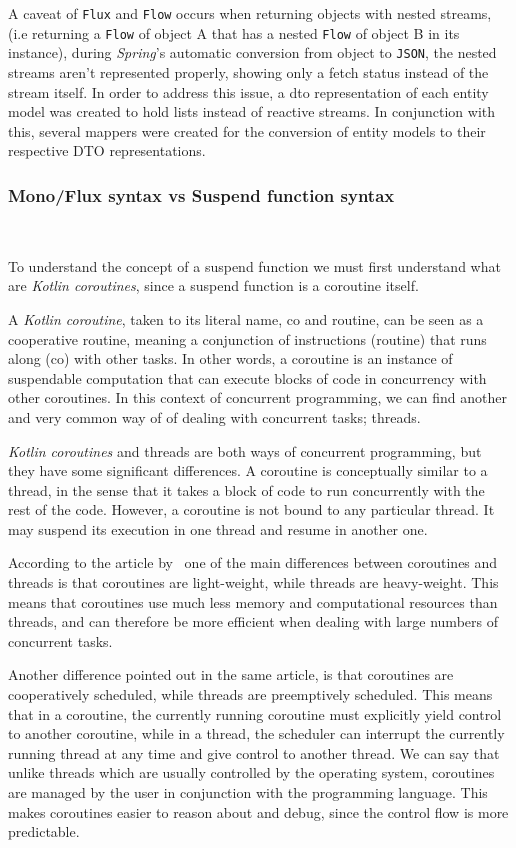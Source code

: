 A caveat of \texttt{Flux} and \texttt{Flow} occurs when returning objects with nested streams, (i.e returning a \texttt{Flow} of object A that has a nested \texttt{Flow} of object B in its instance), during \textit{Spring}'s automatic conversion from object to \texttt{JSON}, the nested streams aren't represented properly, showing only a fetch status instead of the stream itself. In order to address this issue, a \acrfull{dto} representation of each entity model was created to hold lists instead of reactive streams. In conjunction with this, several mappers were created for the conversion of entity models to their respective DTO representations.


\subsubsection{Mono/Flux syntax vs Suspend function syntax}~\label{subsubsec:kotlin-coroutines}

To understand the concept of a suspend function we must first understand what are \textit{Kotlin coroutines}, since a suspend function is a coroutine itself.

A \textit{Kotlin coroutine}, taken to its literal name, co and routine, can be seen as a cooperative routine, meaning a conjunction of instructions (routine) that runs along (co) with other tasks. In other words, a coroutine is an instance of suspendable computation that can execute blocks of code in concurrency with other coroutines.
In this context of concurrent programming, we can find another and very common way of of dealing with concurrent tasks; threads. 

\textit{Kotlin coroutines} and threads are both ways of concurrent programming, but they have some significant differences.
A coroutine is conceptually similar to a thread, in the sense that it takes a block of code to run concurrently with the rest of the code. However, a coroutine is not bound to any particular thread. It may suspend its execution in one thread and resume in another one.~\cite{kotlin-coroutines-your-first}

According to the article by~ one of the main differences between coroutines and threads is that coroutines are light-weight, while threads are heavy-weight. This means that coroutines use much less memory and computational resources than threads, and can therefore be more efficient when dealing with large numbers of concurrent tasks.

Another difference pointed out in the same article, is that coroutines are cooperatively scheduled, while threads are preemptively scheduled. This means that in a coroutine, the currently running coroutine must explicitly yield control to another coroutine, while in a thread, the scheduler can interrupt the currently running thread at any time and give control to another thread. We can say that unlike threads which are usually controlled by the operating system, coroutines are managed by the user in conjunction with the programming language. This makes coroutines easier to reason about and debug, since the control flow is more predictable.

